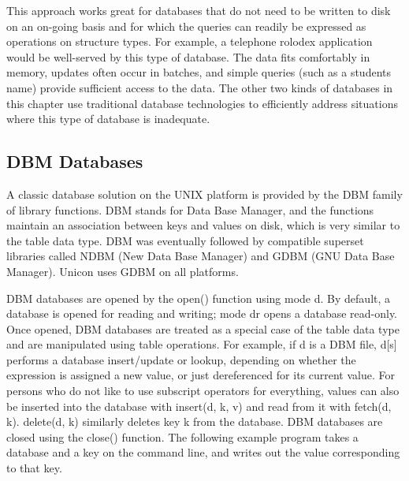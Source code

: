 
This approach works great for databases that do not need to be written
to disk on an on-going basis and for which the queries can readily be
expressed as operations on structure types. For example, a telephone
rolodex application would be well-served by this type of database. The
data fits comfortably in memory, updates often occur in batches, and
simple queries (such as a student{\textquotesingle}s name) provide
sufficient access to the data. The other two kinds of databases in this
chapter use traditional database technologies to efficiently address
situations where this type of database is inadequate.

\subsection{DBM Databases}

A classic database solution on the UNIX platform is provided by the DBM
family of library functions. DBM stands for Data Base
Manager, and the functions maintain an association between keys and
values on disk, which is very similar to the table data type. DBM was
eventually followed by compatible superset libraries called NDBM (New
Data Base Manager) and GDBM (GNU Data Base Manager). Unicon uses GDBM
on all platforms.

DBM databases are opened by the \textsf{open()} function using mode
\textsf{{\textquotedbl}d{\textquotedbl}}. By default, a database is
opened for reading and writing; mode
\textsf{{\textquotedbl}dr{\textquotedbl}} opens a database read-only.
Once opened, DBM databases are treated as a special case of the table
data type and are manipulated using table operations. For example, if
\textsf{d} is a DBM file, \textsf{d[s]} performs a database
insert/update or lookup, depending on whether the expression is
assigned a new value, or just dereferenced for its
current value. For persons who do not like to use subscript operators for everything, values can also be
inserted into the database with \textsf{insert(d, k, v)} and read from it with
\textsf{fetch(d, k)}. \textsf{delete(d, k)} similarly deletes key \textsf{k} from
the database. DBM databases are closed using the \textsf{close()}
function. The following example program takes a database and a key on
the command line, and writes out the value corresponding to that key.

